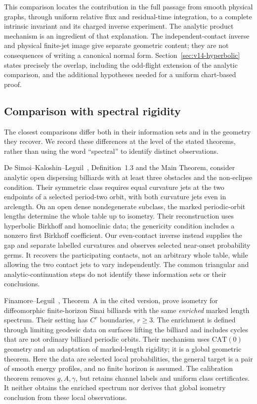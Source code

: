 This comparison locates the contribution in the full passage from
smooth physical graphs, through uniform relative flux and residual-time
integration, to a complete intrinsic invariant and its charged inverse
experiment. The analytic product mechanism is an ingredient of that
explanation. The independent-contact inverse and physical finite-jet
image give separate geometric content; they are not consequences of
writing a canonical normal form. Section~\ref{sec:v14-hyperbolic}
states precisely the overlap, including the odd-flight extension of
the analytic comparison, and the additional hypotheses needed for a
uniform chart-based proof.

\subsection{Comparison with spectral rigidity}
\label{sec:v13-literature}
The closest comparisons differ both in their information sets and in
the geometry they recover. We record these differences at the level
of the stated theorems, rather than using the word ``spectral'' to
identify distinct observations.

De Simoi--Kaloshin--Leguil~\cite{DSKL}, Definition~1.3 and the Main
Theorem, consider analytic open dispersing billiards with at least
three obstacles and the non-eclipse condition. Their symmetric class
requires equal curvature jets at the two endpoints of a selected
period-two orbit, with both curvature jets even in arclength. On an
open dense nondegenerate subclass, the marked periodic-orbit lengths
determine the whole table up to isometry. Their reconstruction uses
hyperbolic Birkhoff and homoclinic data; the genericity condition includes
a nonzero first Birkhoff coefficient. Our even-contact inverse instead
supplies the gap and separate labelled curvatures and observes selected
near-onset probability germs. It recovers the participating contacts,
not an arbitrary whole table, while allowing the two contact jets to
vary independently. The common triangular and analytic-continuation
steps do not identify these information sets or their conclusions.

Finamore--Leguil~\cite{FinamoreLeguil}, Theorem~A in the cited version,
prove isometry for diffeomorphic finite-horizon Sinai billiards with
the same \emph{enriched} marked length spectrum. Their setting has
$C^r$ boundaries, $r\ge3$. The enrichment is defined through limiting
geodesic data on surfaces lifting the billiard and includes cycles
that are not ordinary billiard periodic orbits. Their mechanism uses
$\mathrm{CAT}(0)$ geometry and an adaptation of marked-length rigidity;
it is a global geometric theorem. Here the data are selected local
probabilities, the general target is a pair of smooth energy profiles,
and no finite horizon is assumed. The calibration theorem removes
$g,A,\gamma$, but retains channel labels and uniform class certificates.
It neither obtains the enriched spectrum nor derives that global
isometry conclusion from these local observations.


